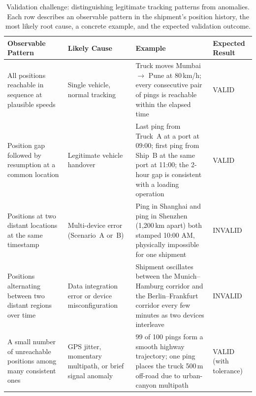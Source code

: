 \begin{table}[h]
\centering
\caption{Validation challenge: distinguishing legitimate tracking patterns from anomalies. Each row describes an observable pattern in the shipment's position history, the most likely root cause, a concrete example, and the expected validation outcome.}
\label{tab:validation_challenge}
\begin{tabular}{|p{30mm}|p{28mm}|p{48mm}|p{22mm}|}
\hline
\textbf{Observable Pattern} & \textbf{Likely Cause} & \textbf{Example} & \textbf{Expected Result} \\
\hline
All positions reachable in sequence at plausible speeds &
Single vehicle, normal tracking &
Truck moves Mumbai $\rightarrow$ Pune at 80\,km/h; every consecutive pair of pings is reachable within the elapsed time &
VALID \\
\hline
Position gap followed by resumption at a common location &
Legitimate vehicle handover &
Last ping from Truck~A at a port at 09:00; first ping from Ship~B at the same port at 11:00; the 2-hour gap is consistent with a loading operation &
VALID \\
\hline
Positions at two distant locations at the same timestamp &
Multi-device error (Scenario~A or~B) &
Ping in Shanghai and ping in Shenzhen (1{,}200\,km apart) both stamped 10:00 AM, physically impossible for one shipment &
INVALID \\
\hline
Positions alternating between two distant regions over time &
Data integration error or device misconfiguration &
Shipment oscillates between the Munich--Hamburg corridor and the Berlin--Frankfurt corridor every few minutes as two devices interleave &
INVALID \\
\hline
A small number of unreachable positions among many consistent ones &
GPS jitter, momentary multipath, or brief signal anomaly &
99 of 100 pings form a smooth highway trajectory; one ping places the truck 500\,m off-road due to urban-canyon multipath &
VALID (with tolerance) \\
\hline
\end{tabular}
\end{table}

